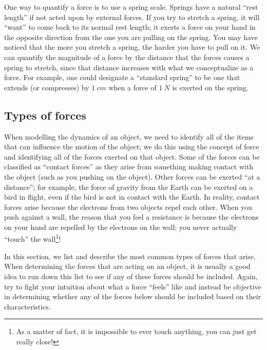 One way to quantify a force is to use a spring scale. Springs have a natural ``rest length'' if not acted upon by external forces. If you try to stretch a spring, it will ``want'' to come back to its normal rest length; it exerts a force on your hand in the opposite direction from the one you are pulling on the spring. You may have noticed that the more you stretch a spring, the harder you have to pull on it. We can quantify the magnitude of a force by the distance that the forces causes a spring to stretch, since that distance increases with what we conceptualize as a force. For example, one could designate a ``standard spring'' to be one that extends (or compresses) by $\SI{1}{cm}$ when a force of $\SI{1}{N}$ is exerted on the spring. 

\subsection{Types of forces}
\label{sec:newtonslaws:typesofforces}
When modelling the dynamics of an object, we need to identify all of the items that can influence the motion of the object; we do this using the concept of force and identifying all of the forces exerted on that object. Some of the forces can be classified as ``contact forces'' as they arise from something making contact with the object (such as you pushing on the object). Other forces can be exerted ``at a distance''; for example, the force of gravity from the Earth can be exerted on a bird in flight, even if the bird is not in contact with the Earth. In reality, contact forces arise because the electrons from two objects repel each other. When you push against a wall, the reason that you feel a resistance is because the electrons on your hand are repelled by the electrons on the wall; you never actually ``touch'' the wall\footnote{As a matter of fact, it is impossible to ever touch anything, you can just get really close!}!

In this section, we list and describe the most common types of forces that arise. When determining the forces that are acting on an object, it is usually a good idea to run down this list to see if any of these forces should be included. Again, try to fight your intuition about what a force ``feels'' like and instead be objective in determining whether any of the forces below should be included based on their characteristics.

